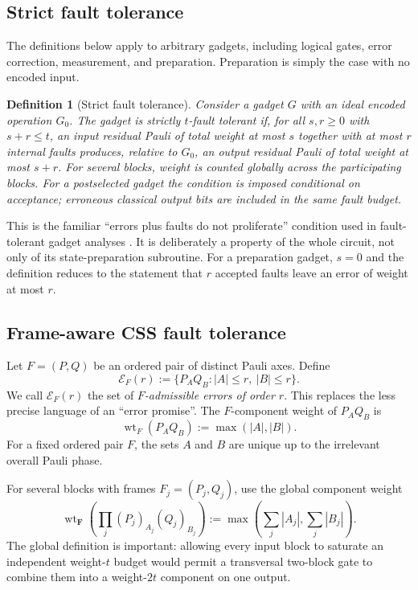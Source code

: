 \documentclass[11pt]{article}
\newtheorem{definition}{Definition}[section]
\theoremstyle{remark}
\newcommand{\cE}{\mathcal E}
\newcommand{\wt}{\operatorname{wt}}
\begin{document}
\subsection{Strict fault tolerance}

The definitions below apply to arbitrary gadgets, including logical gates,
error correction, measurement, and preparation.  Preparation is simply the
case with no encoded input.

\begin{definition}[Strict fault tolerance]
Consider a gadget $G$ with an ideal encoded operation $G_0$.  The gadget is
\emph{strictly $t$-fault tolerant} if, for all $s,r\geq0$ with
$s+r\leq t$, an input residual Pauli of total weight at most $s$ together
with at most $r$ internal faults produces, relative to $G_0$, an output
residual Pauli of total weight at most $s+r$.  For several blocks, weight is
counted globally across the participating blocks.  For a postselected
gadget the condition is imposed conditional on acceptance; erroneous
classical output bits are included in the same fault budget.
\end{definition}

This is the familiar ``errors plus faults do not proliferate'' condition
used in fault-tolerant gadget analyses \cite{AGP}.  It is deliberately a
property of the whole circuit, not only of its state-preparation subroutine.
For a preparation gadget, $s=0$ and the definition reduces to the statement
that $r$ accepted faults leave an error of weight at most $r$.

\subsection{Frame-aware CSS fault tolerance}

Let $F=(P,Q)$ be an ordered pair of distinct Pauli axes.  Define
\[
 \cE_F(r):=\{P_AQ_B: |A|\leq r,\ |B|\leq r\}.
 \tag{2}
\]
We call $\cE_F(r)$ the set of \emph{$F$-admissible errors of order $r$}.
This replaces the less precise language of an ``error promise''.  The
$F$-component weight of $P_AQ_B$ is
\[
 \wt_F(P_AQ_B):=\max(|A|,|B|).
\]
For a fixed ordered pair $F$, the sets $A$ and $B$ are unique up to the
irrelevant overall Pauli phase.

For several blocks with frames $F_j=(P_j,Q_j)$, use the global component
weight
\[
 \wt_{\boldsymbol F}\!\left(\prod_j(P_j)_{A_j}(Q_j)_{B_j}\right)
 :=\max\!\left(\sum_j|A_j|,\sum_j|B_j|\right).
 \tag{3}
\]
The global definition is important: allowing every input block to saturate
an independent weight-$t$ budget would permit a transversal two-block gate
to combine them into a weight-$2t$ component on one output.
\end{document}
